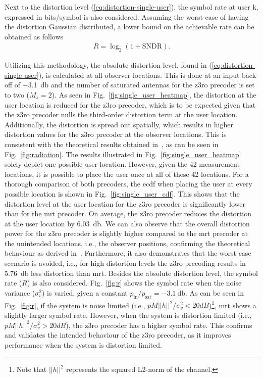 \documentclass[conference]{IEEEtran}
\newcommand{\gilles}[1]{{\color{orange}[Gilles: #1]}}
\newcommand{\update}[1]{{#1}}
\newcommand{\zero}[0]{\gls{z3ro}\xspace}
\newcommand{\zerop}[0]{\zero precoder\xspace}
\newcommand{\mrt}[0]{\gls{mrt}\xspace}
\newcommand{\mrtp}[0]{\mrt precoder\xspace}
\begin{document}
Next to the distortion level (\ref{eq:distortion-single-user}), the symbol rate at user k, expressed in bits/symbol is also considered. Assuming the worst-case of having the distortion Gaussian distributed, a lower bound on the achievable rate can be obtained as follows 
\begin{align}\label{eq:R-single-user}
R = \log_2(1+\mathrm{SNDR}).
\end{align}
 

 Utilizing this methodology, the absolute distortion level, found in (\ref{eq:distortion-single-user}), is calculated at all observer locations. This is done at an input back-off of \SI{-3.1}{\decibel} and the number of saturated antennas for the \zerop is set to two ($M_s = 2$). As seen in Fig.~\ref{fig:single_user_heatmap}, the distortion at the user location is reduced for the \zerop, which is to be expected given that the \zerop nulls the third-order distortion term at the user location. Additionally, the distortion is spread out spatially, which results in higher distortion values for the \zerop at the observer locations. This is consistent with the theoretical results obtained in~\cite{z3ro}, as can be seen in Fig.~\ref{fig:radiation}. \update{The results illustrated in Fig.~\ref{fig:single_user_heatmap} solely depict one possible user location. However, given the 42 measurement locations, it is possible to place the user once at all of these 42 locations. For a thorough comparison of both precoders, the \gls{ecdf} when placing the user at every possible location is shown in Fig.~\ref{fig:single_user_cdf}.} This shows that the distortion level at the user location for the \zerop is significantly lower than for the \mrtp. On average, the \zerop reduces the distortion at the user location by \SI{6.03}{\decibel}. We can also observe that the overall distortion power for the \zerop is slightly higher compared to the \mrtp at the unintended locations, i.e., the observer positions, confirming the theoretical behaviour as derived in~\cite{z3ro}. Furthermore, it also demonstrates that the worst-case scenario is avoided, i.e., for high distortion levels the \zero precoding results in \SI{5.76}{\decibel} less distortion than \gls{mrt}. 
 Besides the absolute distortion level, the symbol rate ($R$) is also considered. Fig.~\ref{fig:r} shows the symbol rate when the noise variance ($\sigma_v^2$) is varied, given a constant $p_{\mathrm{in}}/p_{\mathrm{sat}}=\SI{-3.1}{\decibel}$. As can be seen in Fig.~\ref{fig:r}, if the system is noise limited (i.e., $pM||h||^2/\sigma_v^2 < 20 dB$)\footnote{Note that $||h||^2$ represents the squared L2-norm of the channel.}, \mrt shows a slightly larger symbol rate. However, when the system is distortion limited (i.e.,  $pM||h||^2/\sigma_v^2 > 20 dB$), the \zerop has a higher symbol rate. This confirms and validates the intended behaviour of the \zerop , as it improves performance when the system is distortion limited. 
 
\end{document}
